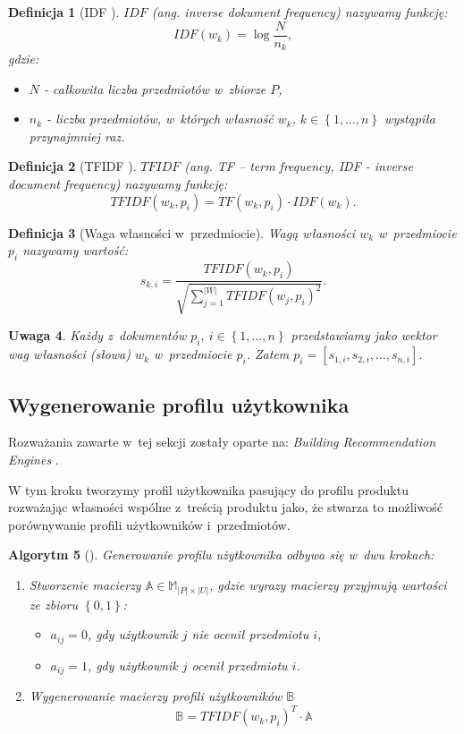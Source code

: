 \documentclass[12pt,a4paper]{report}
\newtheorem{df}{Definicja}[chapter]
\newtheorem{algorytm}[df]{Algorytm}
\newtheorem{uwaga}[df]{Uwaga}
\newcommand{\set}[1]{\left\lbrace {#1} \right\rbrace}
\newcommand{\setUzytkownicy}{\mathit{U}}
\newcommand{\setPrzedmioty}{\mathit{P}}
\begin{document}
\begin{df}[IDF {\citep[Sec 3.3.1.1]{rsh}}]
$IDF$ (ang. \textit{inverse dokument frequency}) nazywamy funkcję:
$$
IDF(w_k) = \log \frac{N}{n_k},
$$
gdzie:
\begin{itemize}
\item $N$ - całkowita liczba przedmiotów w~zbiorze $\setPrzedmioty$,
\item $n_k$ - liczba przedmiotów, w~których własność $w_k$, $k \in \set{1, \ldots, n}$ wystąpiła przynajmniej raz.
\end{itemize}
\end{df}

\begin{df}[TFIDF {\citep[Sec 3.3.1.1]{rsh}}]
$TFIDF$ (ang. \textit{TF – term frequency, IDF - inverse document frequency}) nazywamy funkcję:
$$
TFIDF(w_k, p_i) = TF(w_k, p_i) \cdot IDF(w_k).
$$
\end{df}

\begin{df}[Waga własności w~przedmiocie]
Wagą własności $w_k$ w~przedmiocie $p_i$ nazywamy wartość:
$$
s_{k,i} = \frac{TFIDF(w_k, p_i)}{\sqrt{ \sum_{j=1}^{|W|}{TFIDF(w_j, p_i)}^2}}.
$$
\end{df}

\begin{uwaga}
Każdy z~dokumentów $p_i, \: i\in\set{1,\ldots,n} $ przedstawiamy jako wektor wag własności (słowa) $w_k$ w~przedmiocie $p_i$. Zatem $ p_i = [s_{1,i}, s_{2,i},...,s_{n,i}] $.
\end{uwaga}


\subsection{Wygenerowanie profilu użytkownika}
Rozważania zawarte w~tej sekcji zostały oparte na: \textit{Building Recommendation Engines} {\citep[Sec 3]{bre}}.

W tym kroku tworzymy profil użytkownika pasujący do profilu produktu rozważając własności wspólne z~treścią produktu jako, że stwarza to możliwość porównywanie profili użytkowników i~przedmiotów.

\begin{algorytm}[{\citep[Sec 3]{bre}}]
Generowanie profilu użytkownika odbywa się w~dwu krokach:
\begin{enumerate}
\item Stworzenie macierzy $\mathbb{A} \in \mathbb{M}_{|\setPrzedmioty| \times |\setUzytkownicy| }$, gdzie wyrazy macierzy przyjmują wartości ze zbioru $\set{0,1}$:
\begin{itemize}
\item $a_{ij} = 0$, gdy użytkownik $j$ nie ocenił przedmiotu $i$,
\item $a_{ij} = 1$, gdy użytkownik $j$ ocenił przedmiotu $i$.
\end{itemize}
\item Wygenerowanie macierzy profili użytkowników $\mathbb{B}$
$$
\mathbb{B} = TFIDF(w_k, p_i)^T \cdot \mathbb{A}
$$
\end{enumerate} 

\end{algorytm}
\bigskip
\bigskip
\bigskip
\end{document}
